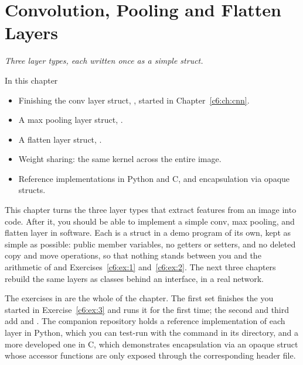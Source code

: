 
\chapter{Convolution, Pooling and Flatten Layers}
\label{c7:ch:layers}

{\large\itshape Three layer types, each written once as a simple struct.\par}

\begin{chapterbox}{In this chapter}
\begin{itemize}
  \item Finishing the conv layer struct, , started in Chapter~\ref{c6:ch:cnn}.
  \item A max pooling layer struct, .
  \item A flatten layer struct, .
  \item Weight sharing: the same kernel across the entire image.
  \item Reference implementations in Python and C, and encapsulation via opaque structs.
\end{itemize}
\end{chapterbox}

This chapter turns the three layer types that extract features from an image into code. After it,
you should be able to implement a simple conv, max pooling, and flatten layer in software. Each is
a struct in a demo program of its own, kept as simple as possible: public member variables, no
getters or setters, and no deleted copy and move operations, so that nothing stands between you and
the arithmetic of  and Exercises~\ref{c6:ex:1} and~\ref{c6:ex:2}. The next three
chapters rebuild the same layers as classes behind an interface, in a real network.

The exercises in  are the whole of the chapter. The first set finishes the
 you started in Exercise~\ref{c6:ex:3} and runs it for the first time; the second
and third add  and . The companion repository holds a
reference implementation of each layer in Python, which you can test-run with the command
 in its directory, and a more developed one in C, which demonstrates
encapsulation via an opaque struct whose accessor functions are only exposed through the
corresponding header file.




